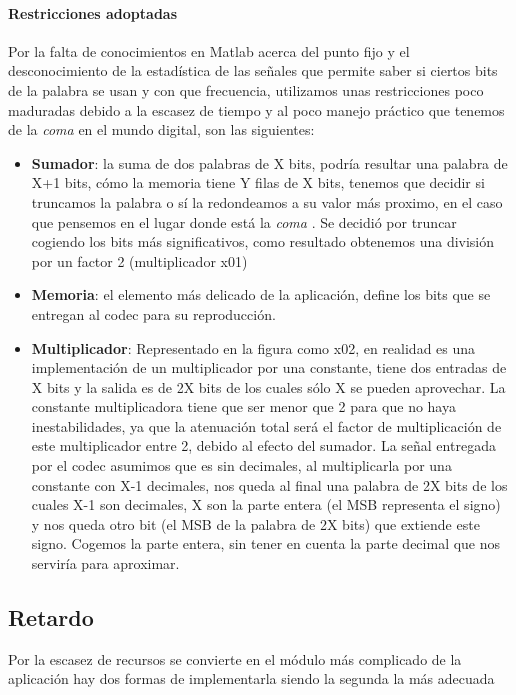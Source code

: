 \paragraph{Restricciones adoptadas} 
	Por la falta de conocimientos en Matlab acerca del punto fijo y el desconocimiento de la estadística de las señales que permite saber si ciertos bits de la palabra se usan y con que frecuencia, utilizamos unas restricciones poco maduradas debido a la escasez de tiempo y al poco manejo práctico que tenemos de la \emph{coma} en el mundo digital, son las siguientes:
\begin{itemize}
\item \textbf{Sumador}: la suma de dos palabras de X bits, podría resultar una palabra de X+1 bits, cómo la memoria tiene Y filas de X bits, tenemos que decidir si truncamos la palabra o sí la redondeamos a su valor más proximo, en el caso que pensemos en el lugar donde está la \emph{coma} . 
	Se decidió por truncar cogiendo los bits más significativos, como resultado obtenemos una división por un factor 2 (multiplicador x01)  
\item \textbf{Memoria}: el elemento más delicado de la aplicación, define los bits que se entregan al codec para su reproducción.
\item \textbf{Multiplicador}: Representado en la figura como x02, en realidad es una implementación de un multiplicador por una constante, tiene dos entradas de X bits y la salida es de 2X bits de los cuales sólo X se pueden aprovechar.  La constante multiplicadora tiene que ser menor que 2 para que no haya inestabilidades, ya que la atenuación total será el factor de multiplicación de este multiplicador entre 2, debido al efecto del sumador. 
	La señal entregada por el codec asumimos que es sin decimales, al multiplicarla por una constante con X-1 decimales, nos queda al final una palabra de 2X bits de los cuales X-1 son decimales, X son la parte entera (el MSB representa el signo) y nos queda otro bit (el MSB de la palabra de 2X bits) que extiende este signo.
	Cogemos la parte entera, sin tener en cuenta la parte decimal que nos serviría para aproximar.
\end{itemize}
 
	\subsection{Retardo}
	Por la escasez de recursos se convierte en el módulo más complicado de la aplicación hay dos formas de implementarla siendo la segunda la más adecuada  
